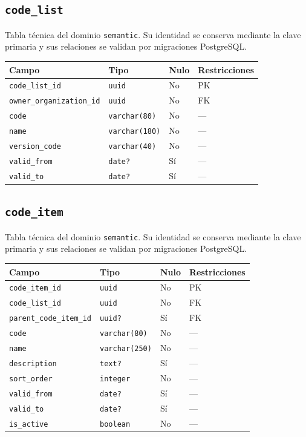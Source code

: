 \documentclass[11pt]{article}
\begin{document}
\subsection{\texttt{code\_list}}
Tabla técnica del dominio \texttt{semantic}. Su identidad se conserva mediante la clave primaria y sus relaciones se validan por migraciones PostgreSQL.
\begin{longtable}{>{\raggedright\arraybackslash}p{} p{} p{} p{}}
\toprule Campo & Tipo & Nulo & Restricciones \\ \midrule\endhead
\texttt{code\_list\_id} & \texttt{uuid} & No & PK \\
\texttt{owner\_organization\_id} & \texttt{uuid} & No & FK \\
\texttt{code} & \texttt{varchar(80)} & No & --- \\
\texttt{name} & \texttt{varchar(180)} & No & --- \\
\texttt{version\_code} & \texttt{varchar(40)} & No & --- \\
\texttt{valid\_from} & \texttt{date?} & Sí & --- \\
\texttt{valid\_to} & \texttt{date?} & Sí & --- \\
\bottomrule\end{longtable}
\subsection{\texttt{code\_item}}
Tabla técnica del dominio \texttt{semantic}. Su identidad se conserva mediante la clave primaria y sus relaciones se validan por migraciones PostgreSQL.
\begin{longtable}{>{\raggedright\arraybackslash}p{} p{} p{} p{}}
\toprule Campo & Tipo & Nulo & Restricciones \\ \midrule\endhead
\texttt{code\_item\_id} & \texttt{uuid} & No & PK \\
\texttt{code\_list\_id} & \texttt{uuid} & No & FK \\
\texttt{parent\_code\_item\_id} & \texttt{uuid?} & Sí & FK \\
\texttt{code} & \texttt{varchar(80)} & No & --- \\
\texttt{name} & \texttt{varchar(250)} & No & --- \\
\texttt{description} & \texttt{text?} & Sí & --- \\
\texttt{sort\_order} & \texttt{integer} & No & --- \\
\texttt{valid\_from} & \texttt{date?} & Sí & --- \\
\texttt{valid\_to} & \texttt{date?} & Sí & --- \\
\texttt{is\_active} & \texttt{boolean} & No & --- \\
\bottomrule\end{longtable}
\end{document}
